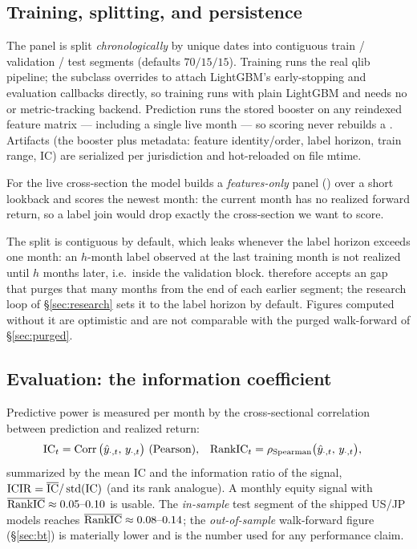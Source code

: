 \documentclass[11pt]{article}
\begin{document}
\subsection{Training, splitting, and persistence}
The panel is split \emph{chronologically} by unique dates into contiguous
train / validation / test segments (defaults $70/15/15$). Training runs the real
qlib  pipeline; the  subclass overrides 
to attach LightGBM's early-stopping and evaluation callbacks directly, so training
runs with plain LightGBM and needs no  or metric-tracking backend.
Prediction runs the stored booster on any reindexed feature matrix --- including a
single live month --- so scoring never rebuilds a . Artifacts (the
booster plus metadata: feature identity/order, label horizon, train range, IC)
are serialized per jurisdiction and hot-reloaded on file mtime.

For the live cross-section the model builds a \emph{features-only} panel
() over a short lookback and scores the newest month:
the current month has no realized forward return, so a label join would drop
exactly the cross-section we want to score.

The split is contiguous by default, which leaks whenever the label horizon exceeds one
month: an $h$-month label observed at the last training month is not realized until
$h$ months later, i.e.\ inside the validation block.  therefore
accepts an  gap that purges that many months from the end of each
earlier segment; the research loop of \S\ref{sec:research} sets it to the label horizon
by default. Figures computed without it are optimistic and are not comparable with the
purged walk-forward of \S\ref{sec:purged}.

\subsection{Evaluation: the information coefficient}
Predictive power is measured per month by the cross-sectional correlation between
prediction and realized return:
\begin{align}
  \IC_t &= \Corr\big(\hat y_{\cdot,t},\,y_{\cdot,t}\big)\ \text{(Pearson)}, &
  \RankIC_t &= \rho_{\text{Spearman}}\big(\hat y_{\cdot,t},\,y_{\cdot,t}\big),
\end{align}
summarized by the mean IC and the information ratio of the signal,
$\mathrm{ICIR}=\overline{\mathrm{IC}}/\operatorname{std}(\mathrm{IC})$ (and its rank analogue). A monthly equity
signal with $\overline{\mathrm{RankIC}}\approx 0.05\text{--}0.10$ is usable. The
\emph{in-sample} test segment of the shipped US/JP models reaches
$\overline{\mathrm{RankIC}}\approx 0.08\text{--}0.14$; the \emph{out-of-sample}
walk-forward figure (\S\ref{sec:bt}) is materially lower and is the number used
for any performance claim.
\end{document}
